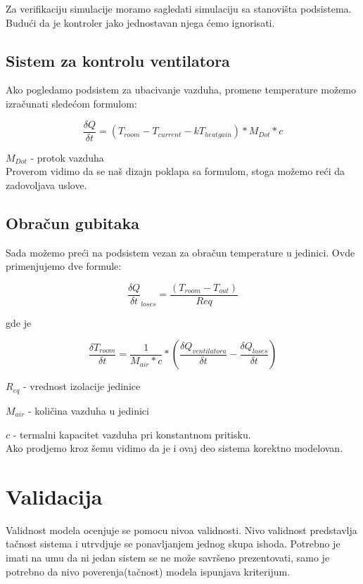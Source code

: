 \documentclass[a4paper,11pt]{book}
\begin{document}
Za verifikaciju simulacije moramo sagledati simulaciju sa stanovišta podsistema. Budući da je kontroler jako jednostavan njega ćemo ignorisati.

\subsection{Sistem za kontrolu ventilatora}

Ako pogledamo podsistem za ubacivanje vazduha, promene temperature možemo izračunati sledećom formulom:

\[ \frac{\delta Q}{\delta t} = (T_{room} - T_{current} - kT_{heat gain}) * M_{Dot} * c\]

$M_{Dot}$ - protok vazduha\\

Proverom vidimo da se naš dizajn poklapa sa formulom, stoga možemo reći da zadovoljava uslove.

\subsection{Obračun gubitaka}

Sada možemo preći na podsistem vezan za obračun temperature u jedinici. Ovde primenjujemo dve formule:

\[ \frac{\delta Q}{\delta t}_{loses} = \frac{(T_{room} - T_{out})} {Req}\]

gde je 

\[ \frac{\delta T_{room}}{\delta t} = \frac{1} {M_{air} * c} * (\frac{\delta Q_{ventilatora}}{\delta t} -  \frac{\delta Q_{loses}}{\delta t})\]

$R_{eq}$ - vrednost izolacije jedinice

$M_{air}$ - količina vazduha u jedinici

$c$ - termalni kapacitet vazduha pri konstantnom pritisku.\\

Ako prodjemo kroz šemu vidimo da je i ovaj deo sistema korektno modelovan.
 
\section{Validacija}

Validnost modela ocenjuje se pomocu nivoa validnosti. Nivo validnost predstavlja tačnost sistema i utrvdjuje se ponavljanjem jednog skupa ishoda. Potrebno je imati na umu da ni jedan sistem se ne može savršeno prezentovati, samo je potrebno da nivo poverenja(tačnost) modela ispunjava kriterijum.
\end{document}
